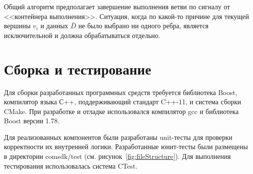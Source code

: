 Общий алгоритм предполагает завершение выполнения ветви по сигналу от <<контейнера выполнения>>. Ситуация, когда по какой-то причине для текущей вершины $v_i$ и данных $\bar{D}$ не было выбрано ни одного ребра, является исключительной и должна обрабатываться отдельно.

\section{Сборка и тестирование}
Для сборки разработанных программных средств требуется библиотека Boost, компилятор языка С++, поддерживающий стандарт C++-11, и система сборки CMake. При разработке и отладке использовался компилятор gcc и библиотека Boost версии 1.78.

Для реализованных компонентов были разработаны unit-тесты для проверки корректности их внутренней логики. Разработанные юнит-тесты были размещены в директории comsdk/test (см. рисунок~\ref{fig:fileStructure}). Для выполнения тестирования использовалась система CTest.
